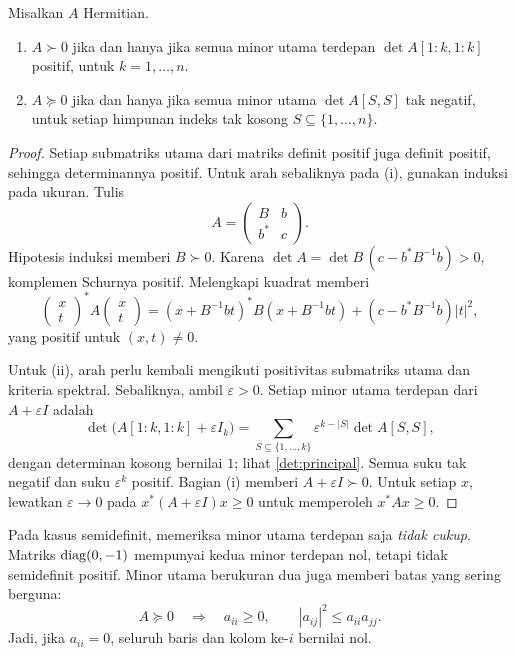 \begin{teorema}
    Misalkan $A$ Hermitian.
    \begin{enumerate}[label=(\roman*),nosep]
        \item $A\succ0$ jika dan hanya jika semua minor utama
            terdepan $\det A[1\!:\!k,1\!:\!k]$ positif,
            untuk $k=1,\ldots,n$.
        \item $A\succeq0$ jika dan hanya jika semua minor utama
            $\det A[S,S]$ tak negatif, untuk setiap himpunan indeks
            tak kosong $S\subseteq\{1,\ldots,n\}$.
    \end{enumerate}
\end{teorema}
\begin{proof}
    Setiap submatriks utama dari matriks definit positif juga
    definit positif, sehingga determinannya positif. Untuk arah
    sebaliknya pada (i), gunakan induksi pada ukuran. Tulis
    \[
        A=\begin{pmatrix}B&b\\b^*&c\end{pmatrix}.
    \]
    Hipotesis induksi memberi $B\succ0$. Karena
    $\det A=\det B\,(c-b^*B^{-1}b)>0$, komplemen Schurnya positif.
    Melengkapi kuadrat memberi
    \[
        \begin{pmatrix}x\\t\end{pmatrix}^{\!*}
        A\begin{pmatrix}x\\t\end{pmatrix}
        =(x+B^{-1}bt)^*B(x+B^{-1}bt)
          +(c-b^*B^{-1}b)|t|^2,
    \]
    yang positif untuk $(x,t)\ne0$.

    Untuk (ii), arah perlu kembali mengikuti positivitas submatriks
    utama dan kriteria spektral. Sebaliknya, ambil $\varepsilon>0$.
    Setiap minor utama terdepan dari $A+\varepsilon I$ adalah
    \[
        \det\bigl(A[1\!:\!k,1\!:\!k]+\varepsilon I_k\bigr)
        =\sum_{S\subseteq\{1,\ldots,k\}}
           \varepsilon^{k-|S|}\det A[S,S],
    \]
    dengan determinan kosong bernilai $1$; lihat
    \autoref{det:principal}. Semua suku tak negatif dan suku
    $\varepsilon^k$ positif. Bagian (i) memberi $A+\varepsilon I\succ0$.
    Untuk setiap $x$, lewatkan $\varepsilon\to0$ pada
    $x^*(A+\varepsilon I)x\ge0$ untuk memperoleh $x^*Ax\ge0$.
\end{proof}

Pada kasus semidefinit, memeriksa minor utama terdepan saja
\emph{tidak cukup}. Matriks $\operatorname{diag}(0,-1)$ mempunyai kedua minor
terdepan nol, tetapi tidak semidefinit positif.
Minor utama berukuran dua juga memberi batas yang sering berguna:
\[
    A\succeq0\quad\Longrightarrow\quad
    a_{ii}\ge0,\qquad |a_{ij}|^2\le a_{ii}a_{jj}.
\]
Jadi, jika $a_{ii}=0$, seluruh baris dan kolom ke-$i$ bernilai nol.

